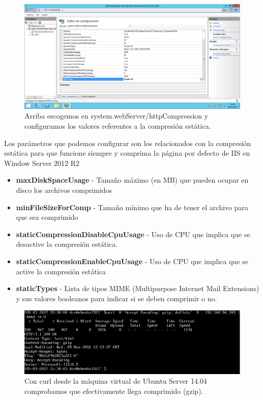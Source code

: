\begin{figure}[H]
	\centering
	\includegraphics[scale=0.4]{iis3.png}
	\caption{Arriba escogemos en system.webServer/httpCompression y configuramos los valores referentes a la compresión estática.}
\end{figure}
Los parámetros que podemos configurar son los relacionados con la compresión estática \cite{c5} para que funcione siempre y comprima la página por defecto de IIS en Window Server 2012 R2
\begin{itemize}
	\item \textbf{maxDiskSpaceUsage} - Tamaño máximo (en MB) que pueden ocupar en disco los archivos comprimidos
	\item \textbf{minFileSizeForComp} - Tamaño mínimo que ha de tener el archivo para que sea comprimido
	\item \textbf{staticCompressionDisableCpuUsage} - Uso de CPU que implica que se desactive la compresión estática.
	\item \textbf{staticCompressionEnableCpuUsage} - Uso de CPU que implica que se active la compresión estática
	\item \textbf{staticTypes} - Lista de tipos MIME (Multipurpose Internet Mail Extensions) y sus valores booleanos para indicar si se deben comprimir o no.
\end{itemize}


\begin{figure}[H]
	\centering
	\includegraphics[scale=0.6]{iis4.png}
	\caption{Con curl desde la máquina virtual de Ubuntu Server 14.04 comprobamos que efectivamente llega comprimido (gzip).}
\end{figure}

